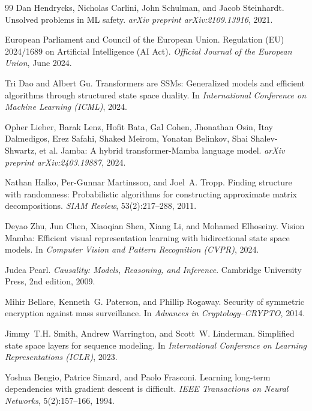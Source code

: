 \documentclass[10pt,twocolumn]{article}
\begin{document}
\begin{thebibliography}{99}
Dan Hendrycks, Nicholas Carlini, John Schulman, and Jacob Steinhardt.
\newblock Unsolved problems in ML safety.
\newblock \emph{arXiv preprint arXiv:2109.13916}, 2021.

European Parliament and Council of the European Union.
\newblock Regulation (EU) 2024/1689 on Artificial Intelligence (AI Act).
\newblock \emph{Official Journal of the European Union}, June 2024.

Tri Dao and Albert Gu.
\newblock Transformers are SSMs: Generalized models and efficient algorithms through structured state space duality.
\newblock In \emph{International Conference on Machine Learning (ICML)}, 2024.

Opher Lieber, Barak Lenz, Hofit Bata, Gal Cohen, Jhonathan Osin, Itay Dalmedigos, Erez Safahi, Shaked Meirom, Yonatan Belinkov, Shai Shalev-Shwartz, et al.
\newblock Jamba: A hybrid transformer-Mamba language model.
\newblock \emph{arXiv preprint arXiv:2403.19887}, 2024.

Nathan Halko, Per-Gunnar Martinsson, and Joel~A. Tropp.
\newblock Finding structure with randomness: Probabilistic algorithms for constructing approximate matrix decompositions.
\newblock \emph{SIAM Review}, 53(2):217--288, 2011.

Deyao Zhu, Jun Chen, Xiaoqian Shen, Xiang Li, and Mohamed Elhoseiny.
\newblock Vision Mamba: Efficient visual representation learning with bidirectional state space models.
\newblock In \emph{Computer Vision and Pattern Recognition (CVPR)}, 2024.

Judea Pearl.
\newblock \emph{Causality: Models, Reasoning, and Inference}.
\newblock Cambridge University Press, 2nd edition, 2009.

Mihir Bellare, Kenneth~G. Paterson, and Phillip Rogaway.
\newblock Security of symmetric encryption against mass surveillance.
\newblock In \emph{Advances in Cryptology--CRYPTO}, 2014.

Jimmy~T.H. Smith, Andrew Warrington, and Scott~W. Linderman.
\newblock Simplified state space layers for sequence modeling.
\newblock In \emph{International Conference on Learning Representations (ICLR)}, 2023.

Yoshua Bengio, Patrice Simard, and Paolo Frasconi.
\newblock Learning long-term dependencies with gradient descent is difficult.
\newblock \emph{IEEE Transactions on Neural Networks}, 5(2):157--166, 1994.


\end{thebibliography}
\end{document}
